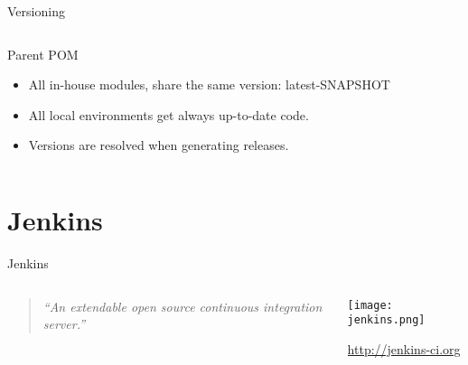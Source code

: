 \documentclass[presentation]{beamer}
\begin{document}
{
\begin{frame}[label=sec-2-4]{Versioning}

\begin{columns}
\begin{column}{0.5\textwidth}
\begin{block}{Parent POM}

\begin{itemize}
\item All in-house modules, share the same version: latest-SNAPSHOT
\item All local environments get always up-to-date code.
\item Versions are resolved when generating releases.
\end{itemize}
\end{block}
\end{column}

\begin{column}{0.5\textwidth}

\end{column}
\end{columns}
\end{frame}} %

\section{Jenkins}
\label{sec-3}

{
\begin{frame}[label=sec-3-1]{Jenkins}

\begin{columns}
\begin{column}{0.6\textwidth}
\begin{quotation} %

\textit{``An extendable open source continuous integration server.''}
\end{quotation}
\end{column}

\begin{column}{0.4\textwidth}
\texttt{[image: jenkins.png]}

\url{http://jenkins-ci.org}
\end{column}
\end{columns}
\end{frame}} %
\end{document}
